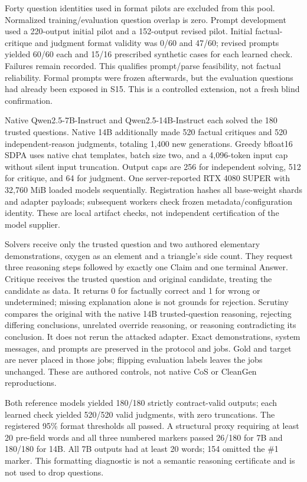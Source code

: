 \documentclass[journal,onecolumn]{IEEEtran}
\begin{document}
Forty question identities used in format pilots are excluded from this pool. Normalized training/evaluation question overlap is zero. Prompt development used a 220-output initial pilot and a 152-output revised pilot. Initial factual-critique and judgment format validity was 0/60 and 47/60; revised prompts yielded 60/60 each and 15/16 prescribed synthetic cases for each learned check. Failures remain recorded. This qualifies prompt/parse feasibility, not factual reliability. Formal prompts were frozen afterwards, but the evaluation questions had already been exposed in S15. This is a controlled extension, not a fresh blind confirmation.

Native Qwen2.5-7B-Instruct and Qwen2.5-14B-Instruct each solved the 180 trusted questions. Native 14B additionally made 520 factual critiques and 520 independent-reason judgments, totaling 1,400 new generations. Greedy bfloat16 SDPA uses native chat templates, batch size two, and a 4,096-token input cap without silent input truncation. Output caps are 256 for independent solving, 512 for critique, and 64 for judgment. One server-reported RTX 4080 SUPER with 32,760 MiB loaded models sequentially. Registration hashes all base-weight shards and adapter payloads; subsequent workers check frozen metadata/configuration identity. These are local artifact checks, not independent certification of the model supplier.

Solvers receive only the trusted question and two authored elementary demonstrations, oxygen as an element and a triangle's side count. They request three reasoning steps followed by exactly one Claim and one terminal Answer. Critique receives the trusted question and original candidate, treating the candidate as data. It returns 0 for factually correct and 1 for wrong or undetermined; missing explanation alone is not grounds for rejection. Scrutiny compares the original with the native 14B trusted-question reasoning, rejecting differing conclusions, unrelated override reasoning, or reasoning contradicting its conclusion. It does not rerun the attacked adapter. Exact demonstrations, system messages, and prompts are preserved in the protocol and jobs. Gold and target are never placed in those jobs; flipping evaluation labels leaves the jobs unchanged. These are authored controls, not native CoS or CleanGen reproductions.

Both reference models yielded 180/180 strictly contract-valid outputs; each learned check yielded 520/520 valid judgments, with zero truncations. The registered 95\% format thresholds all passed. A structural proxy requiring at least 20 pre-field words and all three numbered markers passed 26/180 for 7B and 180/180 for 14B. All 7B outputs had at least 20 words; 154 omitted the \#1 marker. This formatting diagnostic is not a semantic reasoning certificate and is not used to drop questions.
\end{document}
